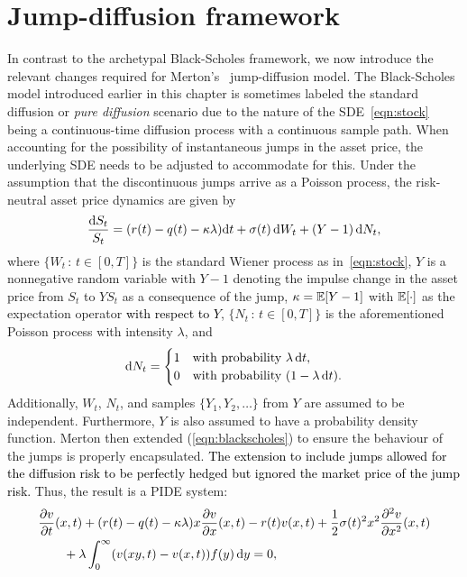 \section{Jump-diffusion framework}
In contrast to the archetypal Black-Scholes framework, we now introduce the relevant changes required for Merton's~\cite{Merton1976} jump-diffusion model. The Black-Scholes model introduced earlier in this chapter is sometimes labeled the standard diffusion or \emph{pure diffusion} scenario due to the nature of the SDE~\eqref{eqn:stock} being a continuous-time diffusion process with a continuous sample path. When accounting for the possibility of instantaneous jumps in the asset price, the underlying SDE needs to be adjusted to accommodate for this. Under the assumption that the discontinuous jumps arrive as a Poisson process, the risk-neutral asset price dynamics are given by
	\begin{equation}
		\label{eqn:assetPriceDynamics}
		\frac{\mathrm d S_t}{S_t} = (r(t) - q(t) - \kappa\lambda)\mathrm d t + \sigma(t) \, \mathrm d W_t + (Y - 1) \, \mathrm d N_t,
	\end{equation}
where $\{W_t \, : \, t \in [0,T]\}$ is the standard Wiener process as in~\eqref{eqn:stock}, $Y$ is a nonnegative random variable with $Y-1$ denoting the impulse change in the asset price from $S_t$ to $YS_t$ as a consequence of the jump, $\kappa = \mathbb E[Y-1]$ with $\mathbb E[\cdot]$ as the expectation operator \textcolor{black}{with respect to $Y$}, $\{N_t \, : \, t \in [0,T]\}$ is the aforementioned Poisson process with intensity $\lambda$, and
	\begin{equation}
		\label{eqn:dNProb}
		\mathrm d N_t = \begin{cases}
			1 &\mbox{with probability } \lambda \, \mathrm d t, \\
			0 &\mbox{with probability } (1 - \lambda \, \mathrm d t).
		\end{cases}
	\end{equation}
Additionally, $W_t$, $N_t$, and samples $\{Y_1,Y_2,\hdots\}$ from $Y$ are assumed to be independent. Furthermore, $Y$ is also assumed to have a probability density function. Merton then extended (\ref{eqn:blackscholes}) to ensure the behaviour of the jumps is properly encapsulated. \textcolor{black}{The extension to include jumps allowed for the diffusion risk to be perfectly hedged but ignored the market price of the jump risk.} Thus, the result is a PIDE system:
	\begin{align}
		\label{eqn:PIDE}
		\begin{split}
			&\frac{\partial v}{\partial t}(x,t) + (r(t) - q(t) - \kappa\lambda)x\frac{\partial v}{\partial x}(x,t) - r(t)v(x,t) + \frac{1}{2}\sigma(t)^2x^2\frac{\partial^2 v}{\partial x^2}(x,t) \\
			& \qquad + \lambda \int_0^\infty (v(xy,t) - v(x,t))f(y) \, \mathrm d y = 0,
		\end{split}
	\end{align}
